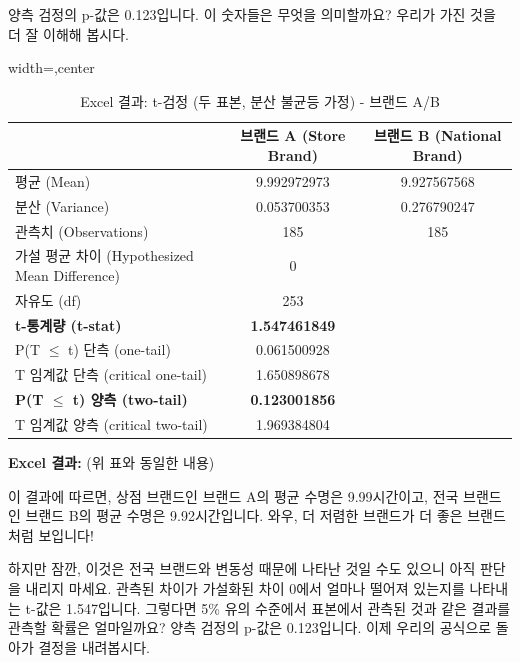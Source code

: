 \documentclass[11pt,a4paper]{article}
\theoremstyle{definition}
\begin{document}
\begin{infobox}[title=두 브랜드 비교 (6/8): 3단계 - p-값 계산 (두 모집단)]
양측 검정의 p-값은 0.123입니다. 이 숫자들은 무엇을 의미할까요? 우리가 가진 것을 더 잘 이해해 봅시다.

\begin{table}[h!]
    \centering
    \caption{Excel 결과: t-검정 (두 표본, 분산 불균등 가정) - 브랜드 A/B}
    \label{tab:excel_output_battery}
    \begin{adjustbox}{width=\textwidth,center}
    \begin{tabular}{lcc}
        \toprule
        \textbf{} & \textbf{브랜드 A (Store Brand)} & \textbf{브랜드 B (National Brand)} \\
        \midrule
        평균 (Mean) & 9.992972973 & 9.927567568 \\
        분산 (Variance) & 0.053700353 & 0.276790247 \\
        관측치 (Observations) & 185 & 185 \\
        가설 평균 차이 (Hypothesized Mean Difference) & 0 & \\
        자유도 (df) & 253 & \\
        \textbf{t-통계량 (t-stat)} & \textbf{1.547461849} & \\
        P(T $\le$ t) 단측 (one-tail) & 0.061500928 & \\
        T 임계값 단측 (critical one-tail) & 1.650898678 & \\
        \textbf{P(T $\le$ t) 양측 (two-tail)} & \textbf{0.123001856} & \\
        T 임계값 양측 (critical two-tail) & 1.969384804 & \\
        \bottomrule
    \end{tabular}
    \end{adjustbox}
\end{table}
\end{infobox}

\begin{infobox}[title=두 브랜드 비교 (7/8): 결과 해석 및 주의점]
\textbf{Excel 결과:} (위 표와 동일한 내용)

이 결과에 따르면, 상점 브랜드인 브랜드 A의 평균 수명은 9.99시간이고, 전국 브랜드인 브랜드 B의 평균 수명은 9.92시간입니다. 와우, 더 저렴한 브랜드가 더 좋은 브랜드처럼 보입니다!

하지만 잠깐, 이것은 전국 브랜드와 변동성 때문에 나타난 것일 수도 있으니 아직 판단을 내리지 마세요. 관측된 차이가 가설화된 차이 0에서 얼마나 떨어져 있는지를 나타내는 t-값은 1.547입니다. 그렇다면 5\% 유의 수준에서 표본에서 관측된 것과 같은 결과를 관측할 확률은 얼마일까요? 양측 검정의 p-값은 0.123입니다. 이제 우리의 공식으로 돌아가 결정을 내려봅시다.
\end{infobox}
\end{document}
